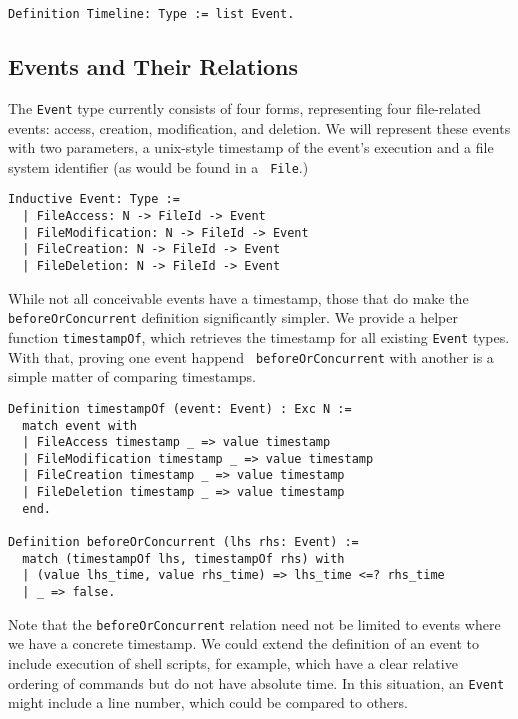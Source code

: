 \documentclass[nocopyrightspace]{sigplanconf}
\begin{document}
\begin{lstlisting}
Definition Timeline: Type := list Event.
\end{lstlisting}

\subsection{Events and Their Relations}

The {\tt Event} type currently consists of four forms, representing four
file-related events: access, creation, modification, and deletion. We will
represent these events with two parameters, a unix-style timestamp of the
event's execution and a file system identifier (as would be found in a {\tt
File}.)

\begin{lstlisting}
Inductive Event: Type :=
  | FileAccess: N -> FileId -> Event
  | FileModification: N -> FileId -> Event
  | FileCreation: N -> FileId -> Event
  | FileDeletion: N -> FileId -> Event
\end{lstlisting}

While not all conceivable events have a timestamp, those that do make the {\tt
beforeOrConcurrent} definition significantly simpler. We provide a helper
function {\tt timestampOf}, which retrieves the timestamp for all existing
{\tt Event} types. With that, proving one event happend {\tt
beforeOrConcurrent} with another is a simple matter of comparing timestamps.

\begin{lstlisting}
Definition timestampOf (event: Event) : Exc N :=
  match event with
  | FileAccess timestamp _ => value timestamp
  | FileModification timestamp _ => value timestamp
  | FileCreation timestamp _ => value timestamp
  | FileDeletion timestamp _ => value timestamp
  end.

Definition beforeOrConcurrent (lhs rhs: Event) :=
  match (timestampOf lhs, timestampOf rhs) with
  | (value lhs_time, value rhs_time) => lhs_time <=? rhs_time
  | _ => false.
\end{lstlisting}

Note that the {\tt beforeOrConcurrent} relation need not be limited to events
where we have a concrete timestamp. We could extend the definition of an event
to include execution of shell scripts, for example, which have a clear
relative ordering of commands but do not have absolute time. In this
situation, an {\tt Event} might include a line number, which could be compared
to others.
\end{document}

